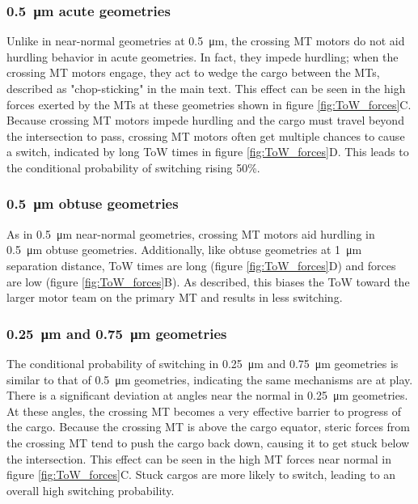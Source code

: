 \subsubsection*{\SI{.5}{\micro\meter} acute geometries}

Unlike in near-normal geometries at \SI{.5}{\micro\meter}, the crossing MT motors do not aid hurdling behavior in acute geometries. In fact, they impede hurdling; when the crossing MT motors engage, they act to wedge the cargo between the MTs, described as "chop-sticking" in the main text. This effect can be seen in the high forces exerted by the MTs at these geometries shown in figure \ref{fig:ToW_forces}C. Because crossing MT motors impede hurdling and the cargo must travel beyond the intersection to pass, crossing MT motors often get multiple chances to cause a switch, indicated by long ToW times in figure \ref{fig:ToW_forces}D. This leads to the conditional probability of switching rising 50\%.

\subsubsection*{\SI{.5}{\micro\meter} obtuse geometries}

As in \SI{.5}{\micro\meter} near-normal geometries, crossing MT motors aid hurdling in \SI{.5}{\micro\meter} obtuse geometries. Additionally, like obtuse geometries at \SI{1}{\micro\meter} separation distance, ToW times are long (figure \ref{fig:ToW_forces}D) and forces are low (figure \ref{fig:ToW_forces}B). As described, this biases the ToW toward the larger motor team on the primary MT and results in less switching.

\subsubsection*{\SI{.25}{\micro\meter} and \SI{.75}{\micro\meter} geometries}

The conditional probability of switching in \SI{.25}{\micro\meter} and \SI{.75}{\micro\meter} geometries is similar to that of \SI{.5}{\micro\meter} geometries, indicating the same mechanisms are at play. There is a significant deviation at angles near the normal in \SI{.25}{\micro\meter} geometries. At these angles, the crossing MT becomes a very effective barrier to progress of the cargo. Because the crossing MT is above the cargo equator, steric forces from the crossing MT tend to push the cargo back down, causing it to get stuck below the intersection. This effect can be seen in the high MT forces near normal in figure \ref{fig:ToW_forces}C. Stuck cargos are more likely to switch, leading to an overall high switching probability.

